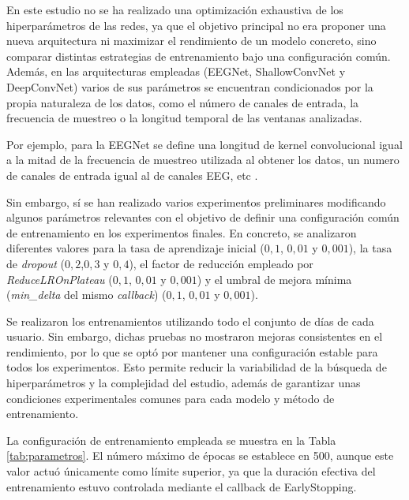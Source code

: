 En este estudio no se ha realizado una optimización exhaustiva de los hiperparámetros de las redes, ya que el objetivo principal no era proponer una nueva arquitectura ni maximizar el rendimiento de un modelo concreto, sino comparar distintas estrategias de entrenamiento bajo una configuración común. Además, en las arquitecturas empleadas (EEGNet, ShallowConvNet y DeepConvNet)  varios de sus parámetros se encuentran condicionados por la propia naturaleza de los datos, como el número de canales de entrada, la frecuencia de muestreo o la longitud temporal de las ventanas analizadas.

Por ejemplo, para la EEGNet se define una longitud de kernel convolucional igual a la mitad de la frecuencia de muestreo utilizada al obtener los datos, un numero de canales de entrada igual al de canales EEG, etc \cite{lawhern_EEGNetCompact2018}.

Sin embargo, sí se han realizado varios experimentos preliminares modificando algunos parámetros relevantes con el objetivo de definir una configuración común de entrenamiento en los experimentos finales. En concreto, se analizaron diferentes valores para la tasa de aprendizaje inicial (\(0,1\), \(0,01\) y \(0,001\)), la tasa de \textit{dropout} (\(0,2\),\(0,3\) y \(0,4\)), el factor de reducción empleado por \textit{ReduceLROnPlateau} (\(0,1\), \(0,01\) y \(0,001\)) y el umbral de mejora mínima (\textit{min\_delta} del mismo \textit{callback}) (\(0,1\), \(0,01\) y \(0,001\)).

Se realizaron los entrenamientos utilizando todo el conjunto de días de cada usuario. Sin embargo, dichas pruebas no mostraron mejoras consistentes en el rendimiento, por lo que se optó por mantener una configuración estable para todos los experimentos. Esto permite reducir la variabilidad de la búsqueda de hiperparámetros y la complejidad del estudio, además de garantizar unas condiciones experimentales comunes para cada modelo y método de entrenamiento.

La configuración de entrenamiento empleada se muestra en la Tabla \ref{tab:parametros}. El número máximo de épocas se establece en 500, aunque este valor actuó únicamente como límite superior, ya que la duración efectiva del entrenamiento estuvo controlada mediante el callback de EarlyStopping.

